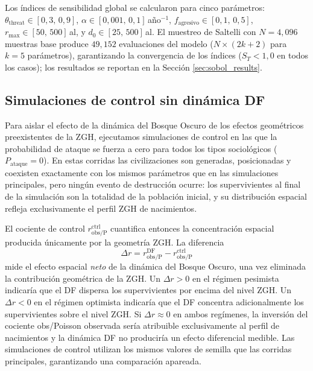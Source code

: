 \documentclass[11pt,a4paper,onecolumn]{article}
\begin{document}
Los índices de sensibilidad global \citep{saltelli2010} se calcularon
para cinco parámetros: $\theta_\text{threat} \in [0{,}3,\,0{,}9]$,
$\alpha \in [0{,}001,\,0{,}1]$\,año$^{-1}$,
$f_\text{agresivo} \in [0{,}1,\,0{,}5]$,
$r_\text{max} \in [50,\,500]$\,al, y
$d_0 \in [25,\,500]$\,al.
El muestreo de Saltelli con $N = 4{,}096$ muestras base produce
$49{,}152$ evaluaciones del modelo ($N \times (2k+2)$ para $k=5$
parámetros), garantizando la convergencia de los índices ($S_T < 1{,}0$
en todos los casos); los resultados se reportan en la
Sección \ref{sec:sobol_results}.

\subsection{Simulaciones de control sin dinámica DF}
\label{sec:control}

Para aislar el efecto de la dinámica del Bosque Oscuro de los efectos
geométricos preexistentes de la ZGH, ejecutamos simulaciones de control
en las que la probabilidad de ataque se fuerza a cero para todos los
tipos sociológicos ($P_\text{ataque} = 0$).
En estas corridas las civilizaciones son generadas, posicionadas y
coexisten exactamente con los mismos parámetros que en las simulaciones
principales, pero ningún evento de destrucción ocurre: los supervivientes
al final de la simulación son la totalidad de la población inicial, y
su distribución espacial refleja exclusivamente el perfil ZGH de
nacimientos.

El cociente de control $r_\text{obs/P}^\text{ctrl}$ cuantifica entonces
la concentración espacial producida únicamente por la geometría ZGH.
La diferencia
\begin{equation}
  \Delta r = r_\text{obs/P}^\text{DF} - r_\text{obs/P}^\text{ctrl}
  \label{eq:delta_r}
\end{equation}
mide el efecto espacial \emph{neto} de la dinámica del Bosque Oscuro,
una vez eliminada la contribución geométrica de la ZGH.
Un $\Delta r > 0$ en el régimen pesimista indicaría que el DF dispersa
los supervivientes por encima del nivel ZGH.
Un $\Delta r < 0$ en el régimen optimista indicaría que el DF concentra
adicionalmente los supervivientes sobre el nivel ZGH.
Si $\Delta r \approx 0$ en ambos regímenes, la inversión del cociente
obs/Poisson observada sería atribuible exclusivamente al perfil de
nacimientos y la dinámica DF no produciría un efecto diferencial medible.
Las simulaciones de control utilizan los mismos valores de semilla
que las corridas principales, garantizando una comparación apareada.
\end{document}
